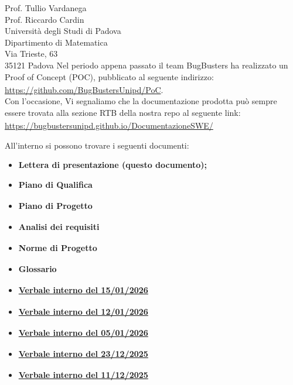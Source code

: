 \documentclass[a4paper,11pt]{letter}
\begin{document}
\begin{letter}{Prof. Tullio Vardanega\\Prof. Riccardo Cardin\\Universit\`a degli Studi di Padova\\Dipartimento di Matematica\\Via Trieste, 63\\35121 Padova}
\vspace{0.8em}
Nel periodo appena passato il team BugBusters ha realizzato un Proof of Concept (POC)\textsubscript{}, pubblicato al seguente indirizzo: \url{https://github.com/BugBustersUnipd/PoC}.\\
Con l'occasione, Vi segnaliamo che la documentazione prodotta può sempre essere trovata alla sezione RTB\textsubscript{} della nostra repo al seguente link: \url{https://bugbustersunipd.github.io/DocumentazioneSWE/}

All'interno si possono trovare i seguenti documenti:

\begin{itemize}
    \item \textbf{Lettera di presentazione (questo documento);}
    \item \textbf{Piano di Qualifica\textsubscript{}}
    \item \textbf{Piano di Progetto\textsubscript{}}
    \item \textbf{Analisi dei requisiti\textsubscript{}}
    \item \textbf{Norme di Progetto\textsubscript{}}
    \item \textbf{Glossario\textsubscript{}}
    \item \href{https://bugbustersunipd.github.io/DocumentazioneSWE/RTB/VERBALI/INTERNI/VI_15-01-26/VI_15-01-26.pdf}{\textbf{Verbale interno\textsubscript{} del 15/01/2026}}
    \item \href{https://bugbustersunipd.github.io/DocumentazioneSWE/RTB/VERBALI/INTERNI/VI_12-01-26/VI_12-01-26.pdf}{\textbf{Verbale interno\textsubscript{} del 12/01/2026}}
    \item \href{https://bugbustersunipd.github.io/DocumentazioneSWE/RTB/VERBALI/INTERNI/VI_05-01-26/VI_05-01-26.pdf}{\textbf{Verbale interno\textsubscript{} del 05/01/2026}}
    \item \href{https://bugbustersunipd.github.io/DocumentazioneSWE/RTB/VERBALI/INTERNI/VI_23-12-25/VI_23-12-25.pdf}{\textbf{Verbale interno\textsubscript{} del 23/12/2025}}
    \item \href{https://bugbustersunipd.github.io/DocumentazioneSWE/RTB/VERBALI/INTERNI/VI_11-12-25/VI_11-12-25.pdf}{\textbf{Verbale interno\textsubscript{} del 11/12/2025}}

\end{itemize}
\end{letter}
\end{document}
